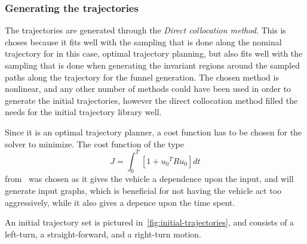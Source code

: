 \subsubsection{Generating the trajectories}

The trajectories are generated through the \textit{Direct collocation method}.
This is choses because it fits well with the sampling that is done along the
nominal trajectory for in this case, optimal trajectory planning, but also fits
well with the sampling that is done when generating the invariant regions around
the sampled paths along the trajectory for the funnel generation. The chosen
method is nonlinear, and any other number of methods could have been used in
order to generate the initial trajectories, however the direct collocation
method filled the needs for the initial trajectory library well.

Since it is an optimal trajectory planner, a cost function has to be chosen for
the solver to minimize. The cost function of the type
\begin{equation}
  J = \int_{0}^{T} \left[ 1 + {u_{0}}^{T}Ru_{0} \right] dt
\end{equation}
from~\cite{majumdarFunnelLibrariesRealtime2017} was chosen as it gives the
vehicle a dependence upon the input, and will generate input graphs, which is
beneficial for not having the vehicle act too aggressively, while it also gives
a depence upon the time spent.

An initial trajectory set is pictured in~\ref{fig:initial-trajectories}, and
consists of a left-turn, a straight-forward, and a right-turn motion.

